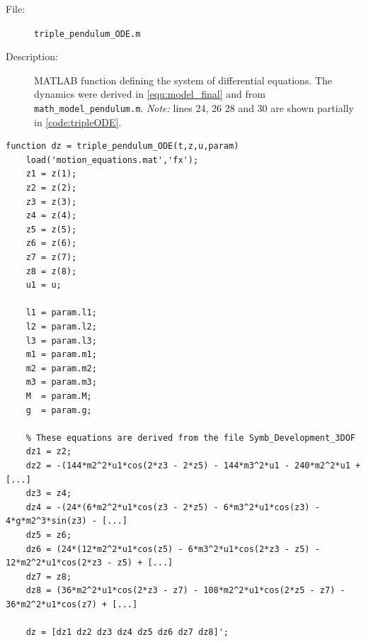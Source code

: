 \documentclass[a4paper,12pt]{article}
\begin{document}
\begin{description}
	\item[File:] \texttt{triple\_pendulum\_ODE.m}
	\item[Description:] MATLAB function defining the system of differential equations. The dynamics were derived in \autoref{equ:model_final} and from \texttt{math\_model\_pendulum.m}. \emph{Note:} lines 24, 26 28 and 30 are shown partially in \autoref{code:tripleODE}.
\end{description}
\begin{lstlisting}[label=code:tripleODE,caption=\texttt{triple\_pendulum\_ODE.m}]
function dz = triple_pendulum_ODE(t,z,u,param)
    load('motion_equations.mat','fx');
	z1 = z(1);
	z2 = z(2);
	z3 = z(3);
	z4 = z(4);
	z5 = z(5);
	z6 = z(6);
	z7 = z(7);
	z8 = z(8);
	u1 = u;

  	l1 = param.l1;
  	l2 = param.l2;
  	l3 = param.l3;
  	m1 = param.m1;
  	m2 = param.m2;
  	m3 = param.m3;
  	M  = param.M;
  	g  = param.g;

  	% These equations are derived from the file Symb_Development_3DOF
	dz1 = z2;
	dz2 = -(144*m2^2*u1*cos(2*z3 - 2*z5) - 144*m3^2*u1 - 240*m2^2*u1 + [...]
	dz3 = z4;
	dz4 = -(24*(6*m2^2*u1*cos(z3 - 2*z5) - 6*m3^2*u1*cos(z3) - 4*g*m2^3*sin(z3) - [...]
	dz5 = z6;
	dz6 = (24*(12*m2^2*u1*cos(z5) - 6*m3^2*u1*cos(2*z3 - z5) - 12*m2^2*u1*cos(2*z3 - z5) + [...]
	dz7 = z8;
	dz8 = (36*m2^2*u1*cos(2*z3 - z7) - 108*m2^2*u1*cos(2*z5 - z7) - 36*m2^2*u1*cos(z7) + [...]

	dz = [dz1 dz2 dz3 dz4 dz5 dz6 dz7 dz8]';
\end{lstlisting}
\end{document}
